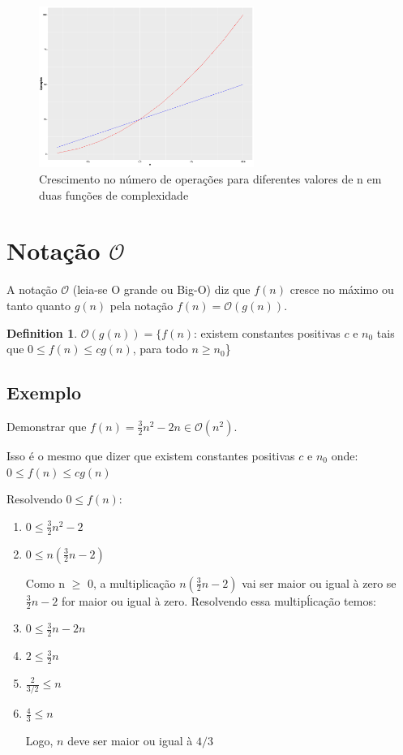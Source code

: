 \documentclass[ a4paper, twocolumn]{article}
\theoremstyle{definition}
\newtheorem{definition}{Definition}[section]
\begin{document}
\begin{figure}[h]
\begin{center}
	\includegraphics[width=7cm]{grow.png}
	\caption{Crescimento no número de operações para diferentes valores de n em duas funções de complexidade}
\end{center}
\end{figure}


\section{Notação $\mathcal{O}$}
A notação $\mathcal{O}$ (leia-se O grande ou Big-O) diz que $f(n)$ cresce no máximo ou tanto quanto $g(n)$ pela notação $f(n) = \mathcal{O}(g(n))$. 

\begin{definition}
$\mathcal{O}(g(n)) = \{f(n)$: existem constantes positivas $c$ e $n_0$ tais que $0 \leq f(n) \leq cg(n)$, para todo $n \geq n_0$\}
\end{definition}

\subsection{Exemplo}
Demonstrar que $f(n) = \frac{3}{2}n^2 - 2n \in \mathcal{O}(n^2)$. 

Isso é o mesmo que dizer que existem constantes positivas $c$ e $n_0$ onde: 
$0 \leq f(n) \leq cg(n)$

Resolvendo $0 \leq f(n)$:

\begin{enumerate}[Step 1:]
\item $0 \leq \frac{3}{2}n^2 - 2$

\item $0 \leq n(\frac{3}{2}n - 2)$

Como n  $\geq$ 0, a multiplicação $n(\frac{3}{2}n - 2)$ vai ser maior ou igual à zero se $\frac{3}{2}n - 2$ for maior ou igual à zero. Resolvendo essa multipĺicação temos: 

\item $0 \leq \frac{3}{2}n - 2n$

\item $2 \leq \frac{3}{2}n$

\item $\frac{2}{3/2} \leq n$

\item $\frac{4}{3} \leq n$

Logo, $n$ deve ser maior ou igual à $4/3$

\end{enumerate}
\end{document}
